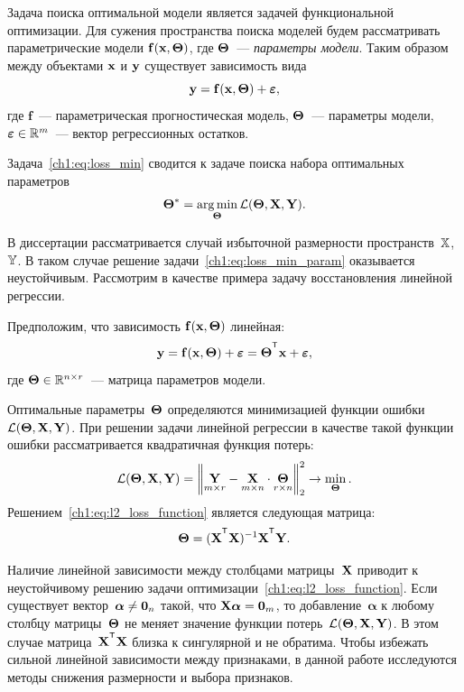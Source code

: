 Задача поиска оптимальной модели является задачей функциональной оптимизации. 
Для сужения пространства поиска моделей будем рассматривать параметрические модели $\mathbf{f}(\mathbf{x}, \boldsymbol{\Theta})$, где $\boldsymbol{\Theta}$~--- \textit{параметры модели}. 
Таким образом между объектами $\mathbf{x}$ и $\mathbf{y}$ существует зависимость вида
\begin{equation}
	\mathbf{y} = \mathbf{f}(\mathbf{x}, \boldsymbol{\Theta}) + \boldsymbol{\varepsilon},
	\label{ch1:eq:reg_model}
\end{equation}
где $\mathbf{f}$~--- параметрическая прогностическая модель, $\boldsymbol{\Theta}$~--- параметры модели, $\boldsymbol{\varepsilon} \in \mathbb{R}^{m}$~--- вектор регрессионных остатков. 

Задача~\eqref{ch1:eq:loss_min} сводится к задаче поиска набора оптимальных параметров
\begin{equation}
	\boldsymbol{\Theta}^* = \mathop{\arg \min}\limits_{\boldsymbol{\Theta}} \mathcal{L}(\boldsymbol{\Theta}, \mathbf{X}, \mathbf{Y}).
	\label{ch1:eq:loss_min_param}
\end{equation}

В диссертации рассматривается случай избыточной размерности пространств~$\mathbb{X}$, $\mathbb{Y}$. 
В таком случае решение задачи~\eqref{ch1:eq:loss_min_param} оказывается неустойчивым. 
Рассмотрим в качестве примера задачу восстановления линейной регрессии.

Предположим, что зависимость $\mathbf{f}(\mathbf{x}, \boldsymbol{\Theta})$ линейная:
\begin{equation}
	\by = \mathbf{f}(\bx, \bTheta) + \bepsilon = \bTheta^{\T} \bx+ \bepsilon,
	\label{ch1:eq:lin_reg_model}
\end{equation}
\noindent где $\boldsymbol{\Theta} \in \mathbb{R}^{n \times r}$~--- матрица параметров модели.

Оптимальные параметры~$\boldsymbol{\Theta}$ определяются минимизацией функции ошибки $\mathcal{L}(\boldsymbol{\Theta}, \mathbf{X}, \mathbf{Y})$.
При решении задачи линейной регрессии в качестве такой функции ошибки рассматривается квадратичная функция потерь:
\begin{equation}
	\mathcal{L}(\boldsymbol{\Theta}, \mathbf{X}, \mathbf{Y}) = {\left\| \underset{m \times r}{\mathbf{Y}}  - \underset{m \times n}{\mathbf{X}} \cdot \underset{r \times n}{\boldsymbol{\Theta}} \right\| }_2^2 \rightarrow\min_{\boldsymbol{\Theta}}.
	\label{ch1:eq:l2_loss_function}
\end{equation}
Решением~\eqref{ch1:eq:l2_loss_function} является следующая матрица:
\begin{equation*}
	\bTheta = (\bX^{\T} \bX)^{-1} \bX^{\T} \bY.
\end{equation*}

Наличие линейной зависимости между столбцами матрицы~$\mathbf{X}$ приводит к неустойчивому решению задачи оптимизации~\eqref{ch1:eq:l2_loss_function}.
Если существует вектор~$\boldsymbol{\alpha} \neq \boldsymbol{0}_n$ такой, что $\mathbf{X} \boldsymbol{\alpha}= \boldsymbol{0}_m$, то добавление~$\boldsymbol{\alpha}$ к любому столбцу матрицы~$\boldsymbol{\Theta}$ не меняет значение функции потерь~$\mathcal{L}(\boldsymbol{\Theta}, \mathbf{X}, \mathbf{Y})$.
В этом случае матрица~$\bX^{\T} \bX$ близка к сингулярной и не обратима.
Чтобы избежать сильной линейной зависимости между признаками, в данной работе исследуются методы снижения размерности и выбора признаков.

